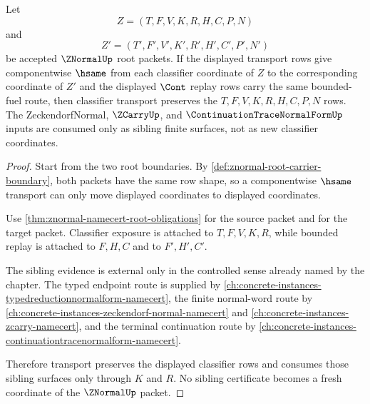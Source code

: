 \begin{theorem}
\label{thm:znormal-classifier-transport}
Let
$$
Z=(T,F,V,K,R,H,C,P,N)
$$
and
$$
Z'=(T',F',V',K',R',H',C',P',N')
$$
be accepted $\ZNormalUp$ root packets. If the displayed transport rows give componentwise $\hsame$ from each classifier coordinate of $Z$ to the corresponding coordinate of $Z'$ and the displayed $\Cont$ replay rows carry the same bounded-fuel route, then classifier transport preserves the $T,F,V,K,R,H,C,P,N$ rows. The ZeckendorfNormal, $\ZCarryUp$, and $\ContinuationTraceNormalFormUp$ inputs are consumed only as sibling finite surfaces, not as new classifier coordinates.
\end{theorem}
\begin{proof}
Start from the two root boundaries. By \autoref{def:znormal-root-carrier-boundary}, both packets have the same row shape, so a componentwise $\hsame$ transport can only move displayed coordinates to displayed coordinates.

Use \autoref{thm:znormal-namecert-root-obligations} for the source packet and for the target packet. Classifier exposure is attached to $T,F,V,K,R$, while bounded replay is attached to $F,H,C$ and to $F',H',C'$.

The sibling evidence is external only in the controlled sense already named by the chapter. The typed endpoint route is supplied by \autoref{ch:concrete-instances-typedreductionnormalform-namecert}, the finite normal-word route by \autoref{ch:concrete-instances-zeckendorf-normal-namecert} and \autoref{ch:concrete-instances-zcarry-namecert}, and the terminal continuation route by \autoref{ch:concrete-instances-continuationtracenormalform-namecert}.

Therefore transport preserves the displayed classifier rows and consumes those sibling surfaces only through $K$ and $R$. No sibling certificate becomes a fresh coordinate of the $\ZNormalUp$ packet.
\end{proof}

